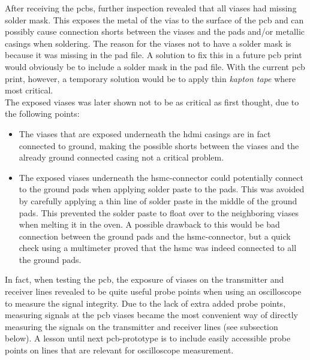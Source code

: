 \documentclass[main.tex]{subfiles}
\begin{document}
After receiving the \glspl{pcb}, further inspection revealed that all viases had missing solder mask. This exposes the metal of the vias to the surface of the \gls{pcb} and can possibly cause connection shorts between the viases and the pads and/or metallic casings when soldering. The reason for the viases not to have a solder mask is because it was missing in the pad file. A solution to fix this in a future \gls{pcb} print would obviously be to include a solder mask in the pad file.
With the current \gls{pcb} print, however, a temporary solution would be to apply thin \textit{kapton tape} where most critical.\\

The exposed viases was later shown not to be as critical as first thought, due to the following points:\\

\begin{itemize}\setlength{\itemsep}{10pt}
\item The viases that are exposed underneath the \gls{hdmi} casings are in fact connected to ground, making the possible shorts between the viases and the already ground connected casing not a critical problem.
\item The exposed viases underneath the \gls{hsmc}-connector could potentially connect to the ground pads when applying solder paste to the pads. This was avoided by carefully applying  a thin line of solder paste in the middle of the ground pads. This prevented the solder paste to float over to the neighboring viases when melting it in the oven. A possible drawback to this would be bad connection between the ground pads and the \gls{hsmc}-connector, but a quick check using a multimeter proved that the \gls{hsmc} was indeed connected to all the ground pads.\\
\end{itemize}

In fact, when testing the \gls{pcb}, the exposure of viases on the transmitter and receiver lines revealed to be quite useful probe points when using an oscilloscope to measure the signal integrity. Due to the lack of extra added probe points, measuring signals at the \gls{pcb} viases became the most convenient way of directly measuring the signals on the transmitter and receiver lines (see subsection below). A lesson until next \gls{pcb}-prototype is to include easily accessible probe points on lines that are relevant for oscilloscope measurement.\\
\end{document}
